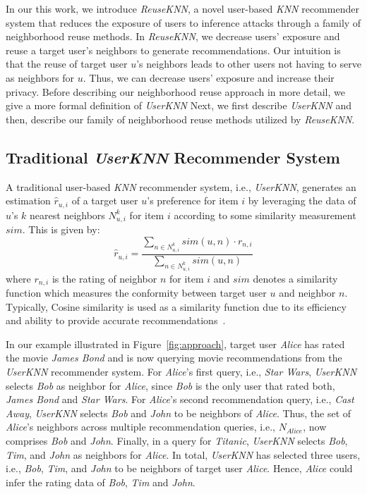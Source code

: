 \documentclass[manuscript,review,anonymous]{acmart}
\newcommand{\el}[1]{
        \textcolor{magenta}{EL: #1}}
\begin{document}
In our this work, we introduce \emph{ReuseKNN}, a novel user-based \emph{KNN} recommender system that reduces the exposure of users to inference attacks through a family of neighborhood reuse methods.
In \emph{ReuseKNN}, we decrease users' exposure and reuse a target user's neighbors to generate recommendations. 
Our intuition is that the reuse of target user $u$'s neighbors leads to other users not having to serve as neighbors for $u$.
Thus, we can decrease users' exposure and increase their privacy.
Before describing our neighborhood reuse approach in more detail, we give a more formal definition of \emph{UserKNN}
Next, we first describe \emph{UserKNN} and then, describe our family of neighborhood reuse methods utilized by \emph{ReuseKNN}.

\subsection{Traditional \emph{UserKNN} Recommender System}
\label{subsec:userknn}
A traditional user-based \emph{KNN} recommender system, i.e., \emph{UserKNN}, generates an estimation $\hat{r}_{u, i}$ of a target user $u$'s preference for item $i$ by leveraging the data of $u$'s $k$ nearest neighbors $N^k_{u, i}$ for item $i$ according to some similarity measurement $sim$. This is given by:
\begin{equation}\label{eq:knn}
    \hat{r}_{u, i} = \frac{\sum_{n \in N^k_{u, i}} sim(u, n) \cdot r_{n, i}}{\sum_{n \in N^k_{u, i}} sim(u, n)}
\end{equation}
where $r_{n, i}$ is the rating of neighbor $n$ for item $i$ and $sim$ denotes a similarity function which measures the conformity between target user $u$ and neighbor $n$.
Typically, Cosine similarity is used as a similarity function due to its efficiency and ability to provide accurate recommendations~\cite{bagchi2015performance,verma2020comparative}.

In our example illustrated in Figure~\ref{fig:approach}, target user \emph{Alice} has rated the movie \emph{James Bond} and is now querying movie recommendations from the \emph{UserKNN} recommender system.
For \emph{Alice}'s first query, i.e., \emph{Star Wars}, \emph{UserKNN} selects \emph{Bob} as neighbor for \emph{Alice}, since \emph{Bob} is the only user that rated both, \emph{James Bond} and \emph{Star Wars}.
For \emph{Alice}'s second recommendation query, i.e., \emph{Cast Away}, \emph{UserKNN} selects \emph{Bob} and \emph{John} to be neighbors of \emph{Alice}.
Thus, the set of \emph{Alice}'s neighbors across multiple recommendation queries, i.e., $N_{Alice}$, now comprises \emph{Bob} and \emph{John}.
Finally, in a query for \emph{Titanic}, \emph{UserKNN} selects \emph{Bob}, \emph{Tim}, and \emph{John} as neighbors for \emph{Alice}.
In total, \emph{UserKNN} has selected three users, i.e., \emph{Bob}, \emph{Tim}, and \emph{John} to be neighbors of target user \emph{Alice}.
Hence, \emph{Alice} could infer the rating data of \emph{Bob}, \emph{Tim} and \emph{John}. 
\end{document}
